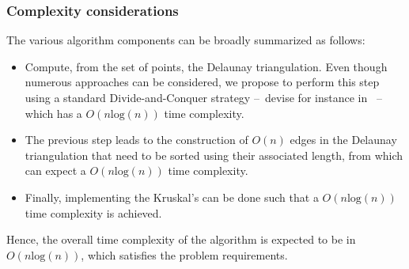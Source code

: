 \documentclass[11pt,a4paper]{article}
\begin{document}
\subsubsection*{Complexity considerations} 

The various algorithm components can be broadly summarized as follows:
\begin{itemize}
	\item Compute, from the set of points, the Delaunay triangulation. Even though numerous approaches can be considered, we propose to perform this step using a standard Divide-and-Conquer strategy --~devise for instance in \cite{guibas1985primitives}~-- which has a $O(n\mathrm{log}(n))$ time complexity.\\
	\item The previous step leads to the construction of $O(n)$ edges in the Delaunay triangulation that need to be sorted using their associated length, from which can expect a $O(n\mathrm{log}(n))$ time complexity.\\
	\item Finally, implementing the Kruskal's can be done such that a $O(n\mathrm{log}(n))$ time complexity is achieved.
\end{itemize}
Hence, the overall time complexity of the algorithm is expected to be in $O(n\mathrm{log}(n))$, which satisfies the problem requirements.


\end{document}
